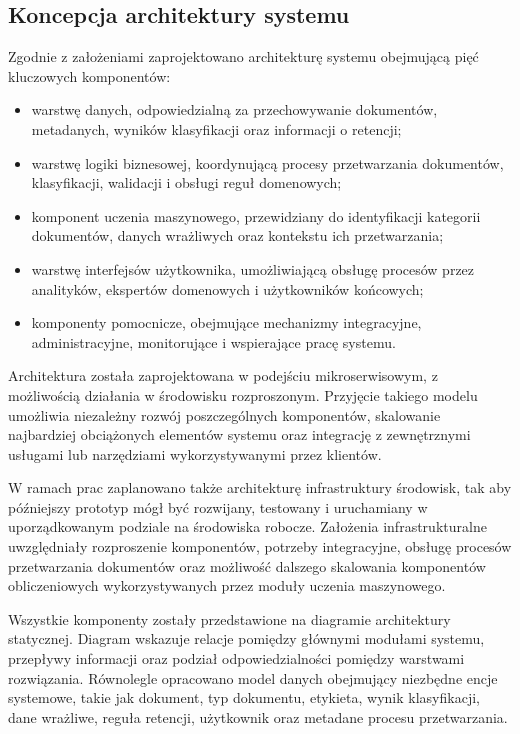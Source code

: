 \documentclass[12pt,a4paper]{report}
\begin{document}
\subsection{Koncepcja architektury systemu}
Zgodnie z założeniami zaprojektowano architekturę systemu obejmującą pięć kluczowych komponentów:

\begin{itemize}
    \item warstwę danych, odpowiedzialną za przechowywanie dokumentów, metadanych, wyników klasyfikacji oraz informacji o retencji;
    \item warstwę logiki biznesowej, koordynującą procesy przetwarzania dokumentów, klasyfikacji, walidacji i obsługi reguł domenowych;
    \item komponent uczenia maszynowego, przewidziany do identyfikacji kategorii dokumentów, danych wrażliwych oraz kontekstu ich przetwarzania;
    \item warstwę interfejsów użytkownika, umożliwiającą obsługę procesów przez analityków, ekspertów domenowych i użytkowników końcowych;
    \item komponenty pomocnicze, obejmujące mechanizmy integracyjne, administracyjne, monitorujące i wspierające pracę systemu.
\end{itemize}

Architektura została zaprojektowana w podejściu mikroserwisowym, z możliwością działania w środowisku rozproszonym. Przyjęcie takiego modelu umożliwia niezależny rozwój poszczególnych komponentów, skalowanie najbardziej obciążonych elementów systemu oraz integrację z zewnętrznymi usługami lub narzędziami wykorzystywanymi przez klientów.

W ramach prac zaplanowano także architekturę infrastruktury środowisk, tak aby późniejszy prototyp mógł być rozwijany, testowany i uruchamiany w uporządkowanym podziale na środowiska robocze. Założenia infrastrukturalne uwzględniały rozproszenie komponentów, potrzeby integracyjne, obsługę procesów przetwarzania dokumentów oraz możliwość dalszego skalowania komponentów obliczeniowych wykorzystywanych przez moduły uczenia maszynowego.

Wszystkie komponenty zostały przedstawione na diagramie architektury statycznej. Diagram wskazuje relacje pomiędzy głównymi modułami systemu, przepływy informacji oraz podział odpowiedzialności pomiędzy warstwami rozwiązania. Równolegle opracowano model danych obejmujący niezbędne encje systemowe, takie jak dokument, typ dokumentu, etykieta, wynik klasyfikacji, dane wrażliwe, reguła retencji, użytkownik oraz metadane procesu przetwarzania.
\end{document}

